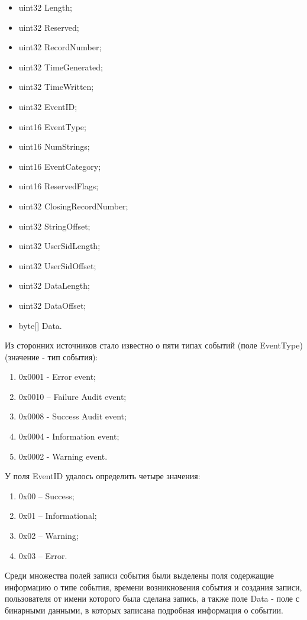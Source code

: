 \begin{itemize}
\item uint32 Length; 
\item uint32 Reserved;
\item uint32 RecordNumber;
\item uint32 TimeGenerated;
\item uint32 TimeWritten;
\item uint32 EventID;
\item uint16 EventType;
\item uint16 NumStrings;
\item uint16 EventCategory;
\item uint16 ReservedFlags;
\item uint32 ClosingRecordNumber;
\item uint32 StringOffset;
\item uint32 UserSidLength;
\item uint32 UserSidOffset;
\item uint32 DataLength;
\item uint32 DataOffset;
\item byte[] Data.
\end{itemize}

Из сторонних источников \cite{evt} стало известно о пяти типах событий (поле EventType) (значение - тип события):

\begin{enumerate}
\item 0x0001 - Error event;
\item 0x0010 – Failure Audit event;
\item 0x0008 - Success Audit event;
\item 0x0004 - Information event;
\item 0x0002 - Warning event.
\end{enumerate}

У поля EventID удалось определить четыре значения:

\begin{enumerate}
\item 0x00 – Success;
\item 0x01 – Informational;
\item 0x02 – Warning;
\item 0x03 – Error.
\end{enumerate}

Среди множества полей записи события были выделены поля содержащие информацию о типе события, времени возникновения события и создания записи, пользователя от имени которого была сделана запись, а также поле Data - поле с бинарными данными, в которых записана подробная информация о событии.

